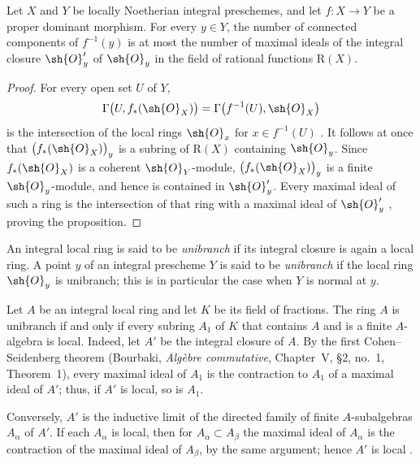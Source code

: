 \begin{proposition}[4.3.5]
\label{III.4.3.5}
Let $X$ and $Y$ be locally Noetherian integral preschemes, and let
$f:X\to Y$ be a proper dominant morphism.  For every $y\in Y$, the
number of connected components of $f^{-1}(y)$ is at most the number
of maximal ideals of the integral closure $\sh{O}'_y$ of
$\sh{O}_y$ in the field of rational functions $\mathrm{R}(X)$.
\end{proposition}

\begin{proof}
For every open set $U$ of $Y$,
\[
  \Gamma\bigl(U,f_*(\sh{O}_X)\bigr)
  =
  \Gamma\bigl(f^{-1}(U),\sh{O}_X\bigr)
\]
is the intersection of the local rings $\sh{O}_x$ for
$x\in f^{-1}(U)$ .  It follows at once that
$\bigl(f_*(\sh{O}_X)\bigr)_y$ is a subring of $\mathrm{R}(X)$ containing
$\sh{O}_y$.  Since $f_*(\sh{O}_X)$ is a coherent
$\sh{O}_Y$-module, $\bigl(f_*(\sh{O}_X)\bigr)_y$ is a finite
$\sh{O}_y$-module, and hence is contained in $\sh{O}'_y$.
Every maximal ideal of such a ring is the intersection of that ring
with a maximal ideal of $\sh{O}'_y$
\cite[vol.~I, pp.~257 and 259]{I-13}, proving the proposition.
\end{proof}

\begin{definition}[4.3.6]
\label{III.4.3.6}
An integral local ring is said to be \emph{unibranch} if its integral
closure is again a local ring.  A point $y$ of an integral prescheme
$Y$ is said to be \emph{unibranch} if the local ring $\sh{O}_y$ is
unibranch; this is in particular the case when $Y$ is normal at
$y$.
\end{definition}

Let $A$ be an integral local ring and let $K$ be its field of
fractions.  The ring $A$ is unibranch if and only if every subring
$A_1$ of $K$ that contains $A$ and is a finite $A$-algebra is
local.  Indeed, let $A'$ be the integral closure of $A$.  By the
first Cohen--Seidenberg theorem (Bourbaki, \emph{Alg\`ebre
commutative}, Chapter~V, \S2, no.~1, Theorem~1), every maximal ideal
of $A_1$ is the contraction to $A_1$ of a maximal ideal of $A'$;
thus, if $A'$ is local, so is $A_1$.


Conversely, $A'$ is the inductive limit of the directed family of
finite $A$-subalgebras $A_\alpha$ of $A'$.  If each $A_\alpha$ is
local, then for $A_\alpha\subset A_\beta$ the maximal ideal of
$A_\alpha$ is the contraction of the maximal ideal of $A_\beta$, by
the same argument; hence $A'$ is local
.

